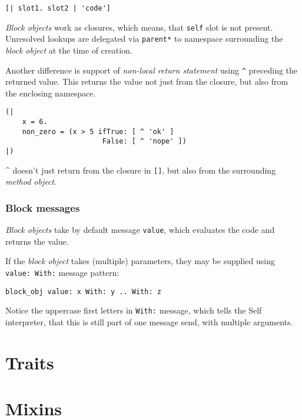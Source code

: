\documentclass[10pt]{article}
\begin{document}
\begin{multicols*}{3}
\begin{lstlisting}
[| slot1. slot2 | 'code']
\end{lstlisting}

\textit{Block objects} work as closures, which means, that \texttt{self} slot is not present. Unresolved lookups are delegated via \texttt{parent*} to namespace surrounding the \textit{block object} at the time of creation.

Another difference is support of \textit{non-local return statement} using \texttt{\^} preceding the returned value. This returns the value not just from the closure, but also from the enclosing namespace.

\begin{lstlisting}
(|
    x = 6.
    non_zero = (x > 5 ifTrue: [ ^ 'ok' ]
                       False: [ ^ 'nope' ])
|)
\end{lstlisting}

\^{} doesn't just return from the closure in \texttt{[]}, but also from the surrounding \textit{method object}.


\subsubsection{Block messages}
\textit{Block objects} take by default message \texttt{value}, which evaluates the code and returns the value.

If the \textit{block object} takes (multiple) parameters, they may be supplied using \texttt{value:\ With:} message pattern:

\begin{lstlisting}
block_obj value: x With: y .. With: z
\end{lstlisting}

Notice the uppercase first letters in \texttt{With:} message, which tells the Self interpreter, that this is still part of one message send, with multiple arguments.




\pagebreak %
\section{Traits}

\section{Mixins}



\end{multicols*}
\end{document}
